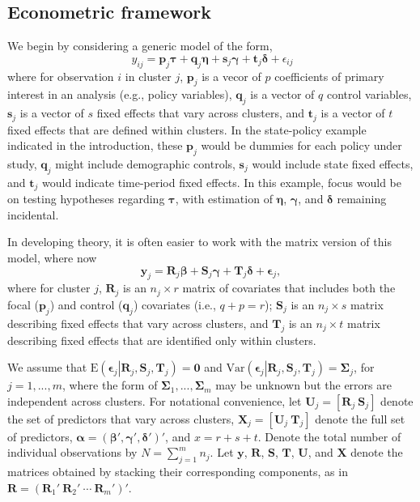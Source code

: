 \documentclass[12pt]{article}
\newcommand{\E}{\text{E}}
\newcommand{\Var}{\text{Var}}
\newcommand{\bm}{\mathbf}
\newcommand{\bs}{\boldsymbol}
\begin{document}

\subsection{Econometric framework}

We begin by considering a generic model of the form,
\begin{equation}
\label{eq:fixed_effects_ij}
\ {y}_{ij} = \bm{p}_j \bs\tau + \bm{q}_j\bs\eta + \bm{s}_j \bs\gamma + \bm{t}_j \bs\delta + \epsilon_{ij} 
\end{equation}
where for observation $i$ in cluster $j$, $\bm{p}_j$ is a vecor of $p$ coefficients of primary interest in an analysis (e.g., policy variables), $\bm{q}_j$ is a vector of $q$ control variables, $\bm{s}_j$ is a vector of $s$ fixed effects that vary across clusters, and $\bm{t}_j$ is a vector of $t$ fixed effects that are defined within clusters. In the state-policy example indicated in the introduction, these $\bm{p}_j$ would be dummies for each policy under study, $\bm{q}_j$ might include demographic controls, $\bm{s}_j$ would include state fixed effects, and $\bm{t}_j$ would indicate time-period fixed effects. In this example, focus would be on testing hypotheses regarding $\bs \tau$, with estimation of $\bs\eta$, $\bs\gamma$, and $\bs\delta$ remaining incidental. 

In developing theory, it is often easier to work with the matrix version of this model, where now
\begin{equation}
\label{eq:fixed_effects}
\bm{y}_j = \bm{R}_j \bs\beta + \bm{S}_j \bs\gamma + \bm{T}_j \bs\delta + \bs\epsilon_j,
\end{equation}
where for cluster $j$, $\bm{R}_j$ is an $n_j \times r$ matrix of covariates that includes both the focal ($\bm{p}_j$) and control ($\bm{q}_j$) covariates (i.e., $q + p = r$); $\bm{S}_j$ is an $n_j \times s$ matrix describing fixed effects that vary across clusters, and $\bm{T}_j$ is an $n_j \times t$ matrix describing fixed effects that are identified only within clusters. 

We assume that $\E\left(\bs\epsilon_j\left|\bm{R}_j,\bm{S}_j, \bm{T}_j\right.\right) = \bm{0}$ and $\Var\left(\bs\epsilon_j\left|\bm{R}_j,\bm{S}_j,\bm{T}_j\right.\right) = \bs\Sigma_j$, for $j = 1,...,m$, where the form of $\bs\Sigma_1,...,\bs\Sigma_m$ may be unknown but the errors are independent across clusters. 
For notational convenience, let $\bm{U}_j = \left[\bm{R}_j \ \bm{S}_j \right]$ denote the set of predictors that vary across clusters, $\bm{X}_j = \left[\bm{U}_j \ \bm{T}_j \right]$ denote the full set of predictors, $\bs\alpha = \left(\bs\beta', \bs\gamma', \bs\delta' \right)'$, and $x = r + s + t$.
Denote the total number of individual observations by $N = \sum_{j=1}^m n_j$.
Let $\bm{y}$, $\bm{R}$, $\bm{S}$, $\bm{T}$, $\bm{U}$, and $\bm{X}$ denote the matrices obtained by stacking their corresponding components, as in $\bm{R} = \left(\bm{R}_1' \ \bm{R}_2' \ \cdots \ \bm{R}_m'\right)'$. 
\end{document}
